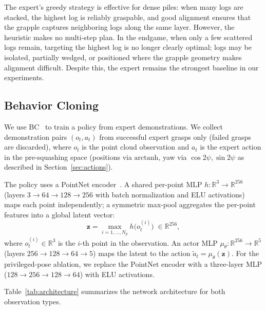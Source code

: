 \documentclass[conference]{IEEEtran}
\begin{document}
The expert's greedy strategy is effective for dense piles: when many logs are stacked, the highest log is reliably graspable, and good alignment ensures that the grapple captures neighboring logs along the same layer.
However, the heuristic makes no multi-step plan.
In the endgame, when only a few scattered logs remain, targeting the highest log is no longer clearly optimal; logs may be isolated, partially wedged, or positioned where the grapple geometry makes alignment difficult.
Despite this, the expert remains the strongest baseline in our experiments.

\subsection{Behavior Cloning}
\label{sec:bc}
We use BC~\cite{pomerleau1988alvinn} to train a policy from expert demonstrations.
We collect demonstration pairs $(o_t, a_t)$ from successful expert grasps only (failed grasps are discarded), where $o_t$ is the point cloud observation and $a_t$ is the expert action in the pre-squashing space (positions via $\mathrm{arctanh}$, yaw via $\cos 2\psi, \sin 2\psi$ as described in Section~\ref{sec:actions}).

The policy uses a PointNet encoder~\cite{qi2017pointnet}.
A shared per-point MLP $h: \mathbb{R}^3 \to \mathbb{R}^{256}$ (layers $3 \!\to\! 64 \!\to\! 128 \!\to\! 256$ with batch normalization and ELU activations) maps each point independently; a symmetric max-pool aggregates the per-point features into a global latent vector:
\begin{equation}
    \mathbf{z} = \max_{i=1,\ldots,N_p} h\!\big(o_t^{(i)}\big) \;\in \mathbb{R}^{256},
\end{equation}
where $o_t^{(i)} \in \mathbb{R}^3$ is the $i$-th point in the observation.
An actor MLP $\mu_\theta: \mathbb{R}^{256} \to \mathbb{R}^{5}$ (layers $256 \!\to\! 128 \!\to\! 64 \!\to\! 5$) maps the latent to the action $\tilde{a}_t = \mu_\theta(\mathbf{z})$.
For the privileged-pose ablation, we replace the PointNet encoder with a three-layer MLP ($128 \!\to\! 256 \!\to\! 128 \!\to\! 64$) with ELU activations.

Table~\ref{tab:architecture} summarizes the network architecture for both observation types.
\end{document}
